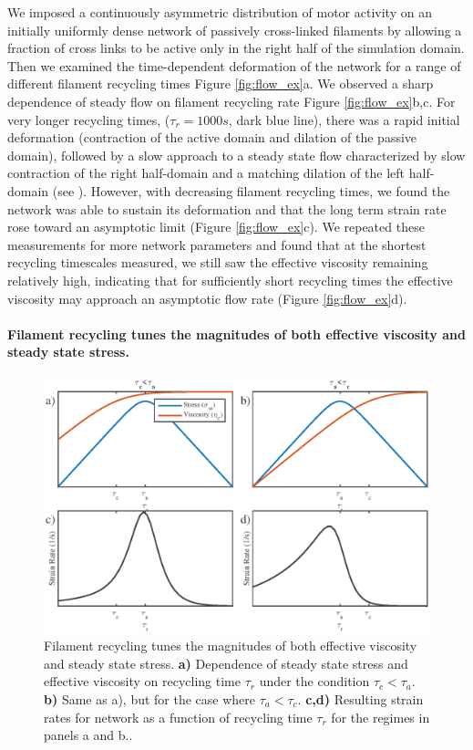 \documentclass[10pt,letterpaper]{article}
\begin{document}
We imposed a continuously asymmetric distribution of motor activity on an initially uniformly dense network of passively cross-linked filaments by allowing a fraction of cross links to be active only in the right half of the simulation domain. Then we examined the time-dependent deformation of the network for a range of different filament recycling times Figure \ref{fig:flow_ex}a. We observed a sharp dependence of steady flow on filament recycling rate Figure \ref{fig:flow_ex}b,c. For very longer recycling times, ($\tau_r=1000 s$, dark blue line), there was a rapid initial deformation (contraction of the active domain and dilation of the passive domain), followed by a slow approach to a steady state flow characterized by slow contraction of the right half-domain and a matching dilation of the left half-domain (see ).  However, with decreasing filament recycling times, we found the network was able to sustain its deformation and that the long term strain rate rose toward an asymptotic limit (Figure \ref{fig:flow_ex}c).  We repeated these measurements for more network parameters and found that at the shortest recycling timescales measured, we still saw the effective viscosity remaining relatively high, indicating that for sufficiently short recycling times the effective viscosity may approach an asymptotic flow rate (Figure \ref{fig:flow_ex}d).







\paragraph{Filament recycling tunes the magnitudes of both effective viscosity and steady state stress.}  


\begin{figure}[h!]
	\centering
	\includegraphics[width=\hsize]{figures/figure_theor}
	\caption{\label{fig:flow_theo}  Filament recycling tunes the magnitudes of both effective viscosity and steady state stress. \textbf{a)}  Dependence of steady state stress and effective viscosity on recycling time $\tau_r$ under the condition $\tau_c<\tau_a$. \textbf{b)} Same as a), but for the case where $\tau_a<\tau_c$.  \textbf{c,d)} Resulting strain rates for network as a function of recycling time $\tau_r$ for the regimes in panels a and b..  }
\end{figure}
\end{document}
